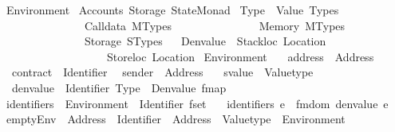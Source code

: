 %
\begin{isabellebody}%
%
%
\isadelimdocument
%
\endisadelimdocument
%
\isatagdocument
%
\isamarkuptrue%
%
\endisatagdocument
{\isafolddocument}%
%
\isadelimdocument
%
\endisadelimdocument
%
\isadelimtheory
%
\endisadelimtheory
%
\isatagtheory
{}\isamarkupfalse%
\ Environment\isanewline
{}\ Accounts\ Storage\ StateMonad\isanewline
{}%
\endisatagtheory
{\isafoldtheory}%
%
\isadelimtheory
%
\endisadelimtheory
%
\isadelimdocument
%
\endisadelimdocument
%
\isatagdocument
%
\isamarkuptrue%
%
\endisatagdocument
{\isafolddocument}%
%
\isadelimdocument
%
\endisadelimdocument
{}\isamarkupfalse%
\ Type\ {\isacharequal}{\kern0pt}\ Value\ Types\isanewline
\ \ \ \ \ \ \ \ \ \ \ \ \ \ {\isacharbar}{\kern0pt}\ Calldata\ MTypes\isanewline
\ \ \ \ \ \ \ \ \ \ \ \ \ \ {\isacharbar}{\kern0pt}\ Memory\ MTypes\isanewline
\ \ \ \ \ \ \ \ \ \ \ \ \ \ {\isacharbar}{\kern0pt}\ Storage\ STypes\isanewline
\ \isanewline
{}\isamarkupfalse%
\ Denvalue\ {\isacharequal}{\kern0pt}\ Stackloc\ Location\isanewline
\ \ \ \ \ \ \ \ \ \ \ \ \ \ \ \ \ \ {\isacharbar}{\kern0pt}\ Storeloc\ Location\isanewline
\isanewline
{}\isamarkupfalse%
\ Environment\ {\isacharequal}{\kern0pt}\isanewline
\ \ address\ {\isacharcolon}{\kern0pt}{\isacharcolon}{\kern0pt}\ Address\ \isanewline
\ \ contract\ {\isacharcolon}{\kern0pt}{\isacharcolon}{\kern0pt}\ Identifier\isanewline
\ \ sender\ {\isacharcolon}{\kern0pt}{\isacharcolon}{\kern0pt}\ Address\ \isanewline
\ \ svalue\ {\isacharcolon}{\kern0pt}{\isacharcolon}{\kern0pt}\ Valuetype\ \isanewline
\ \ denvalue\ {\isacharcolon}{\kern0pt}{\isacharcolon}{\kern0pt}\ {\isachardoublequoteopen}{\isacharparenleft}{\kern0pt}Identifier{\isacharcomma}{\kern0pt}\ Type\ {\isasymtimes}\ Denvalue{\isacharparenright}{\kern0pt}\ fmap{\isachardoublequoteclose}\isanewline
\ \isanewline
{}\isamarkupfalse%
\ identifiers\ {\isacharcolon}{\kern0pt}{\isacharcolon}{\kern0pt}\ {\isachardoublequoteopen}Environment\ {\isasymRightarrow}\ Identifier\ fset{\isachardoublequoteclose}\isanewline
\ \ \ {\isachardoublequoteopen}identifiers\ e\ {\isacharequal}{\kern0pt}\ fmdom\ {\isacharparenleft}{\kern0pt}denvalue\ e{\isacharparenright}{\kern0pt}{\isachardoublequoteclose}\isanewline
\ \isanewline
{}\isamarkupfalse%
\ emptyEnv\ {\isacharcolon}{\kern0pt}{\isacharcolon}{\kern0pt}\ {\isachardoublequoteopen}Address\ {\isasymRightarrow}\ Identifier\ {\isasymRightarrow}\ Address\ {\isasymRightarrow}\ Valuetype\ {\isasymRightarrow}\ Environment{\isachardoublequoteclose}\isanewline

\end{isabellebody}
